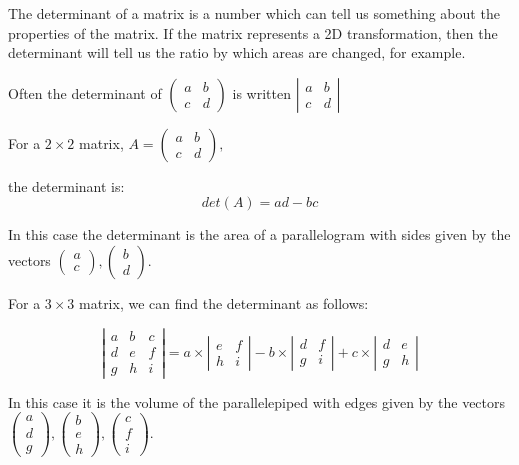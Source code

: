The determinant of a matrix is a number which can tell us something about 
the properties of the matrix. If the matrix represents a 2D transformation,
then the determinant will tell us the ratio by which areas are changed, for example.
\par
Often the determinant of 
$ \left( 
\begin{array}{cc} 
  a & b \\
  c & d 
\end{array} 
\right ) $ is written
$ \left| 
\begin{array}{cc}
  a & b \\
  c & d 
\end{array} 
\right|
$
\par
For a $2 \times 2$ matrix, 
$ A = 
\left( 
\begin{array}{cc}
  a & b \\
  c & d 
\end{array} 
\right ) , $
\par
the determinant is:
\[ det(A) = ad - bc \]
\par
In this case the determinant is the area of a parallelogram with sides given by the vectors $ 
\left( 
\begin{array}{c} 
  a \\ 
  c 
\end{array} 
\right ),
\left( 
\begin{array}{c}
  b \\ 
  d 
\end{array} \right). $
\par
For a $3 \times 3$ matrix, we can find the determinant as follows:
\par
 \[ \left| 
 \begin{array}{ccc} 
   a & b & c \\
   d & e & f \\
   g & h & i 
 \end{array} 
 \right |
= a \times 
\left| 
\begin{array}{cc}
  e & f \\
  h & i 
\end{array} 
\right| 
- b \times 
\left| 
\begin{array}{cc} 
  d & f \\ 
  g & i 
\end{array} 
\right |
+ c \times 
\left| 
\begin{array}{cc} 
  d & e \\
  g & h 
\end{array} 
\right| \]
\par
In this case it is the volume of the parallelepiped with edges given by the vectors
$ \left( 
\begin{array}{c} 
  a \\
  d \\
  g 
  \end{array} 
\right),
\left( 
\begin{array}{c}
  b \\
  e \\
  h 
\end{array} 
\right) , 
\left( 
\begin{array}{c}
  c \\
  f \\
  i 
\end{array} 
\right ) . $
